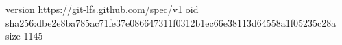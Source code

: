 version https://git-lfs.github.com/spec/v1
oid sha256:dbe2e8ba785ac71fe37e086647311f0312b1ec66e38113d64558a1f05235c28a
size 1145
